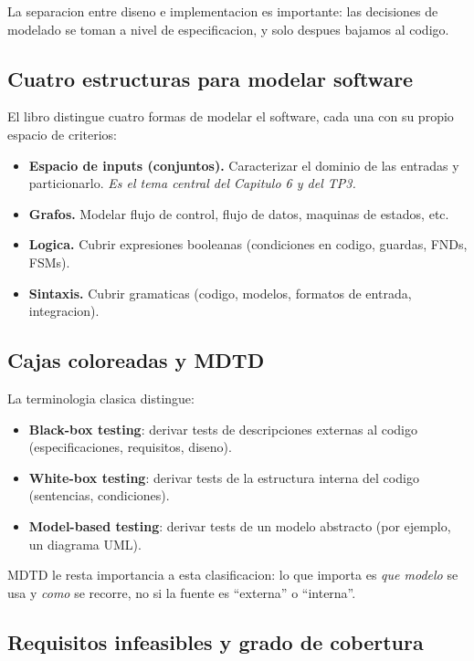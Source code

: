 \documentclass[12pt,a4paper]{article}
\begin{document}
La separacion entre diseno e implementacion es importante: las decisiones de modelado se toman a
nivel de especificacion, y solo despues bajamos al codigo.

\subsection{Cuatro estructuras para modelar software}

El libro distingue cuatro formas de modelar el software, cada una con su propio espacio de
criterios:

\begin{itemize}
  \item \textbf{Espacio de inputs (conjuntos).} Caracterizar el dominio de las entradas y
  particionarlo. \emph{Es el tema central del Capitulo 6 y del TP3.}
  \item \textbf{Grafos.} Modelar flujo de control, flujo de datos, maquinas de estados, etc.
  \item \textbf{Logica.} Cubrir expresiones booleanas (condiciones en codigo, guardas, FNDs, FSMs).
  \item \textbf{Sintaxis.} Cubrir gramaticas (codigo, modelos, formatos de entrada, integracion).
\end{itemize}

\subsection{Cajas coloreadas y MDTD}

La terminologia clasica distingue:
\begin{itemize}
  \item \textbf{Black-box testing}: derivar tests de descripciones externas al codigo
  (especificaciones, requisitos, diseno).
  \item \textbf{White-box testing}: derivar tests de la estructura interna del codigo (sentencias,
  condiciones).
  \item \textbf{Model-based testing}: derivar tests de un modelo abstracto (por ejemplo, un
  diagrama UML).
\end{itemize}
MDTD le resta importancia a esta clasificacion: lo que importa es \emph{que modelo} se usa y
\emph{como} se recorre, no si la fuente es ``externa'' o ``interna''.

\subsection{Requisitos infeasibles y grado de cobertura}
\end{document}
